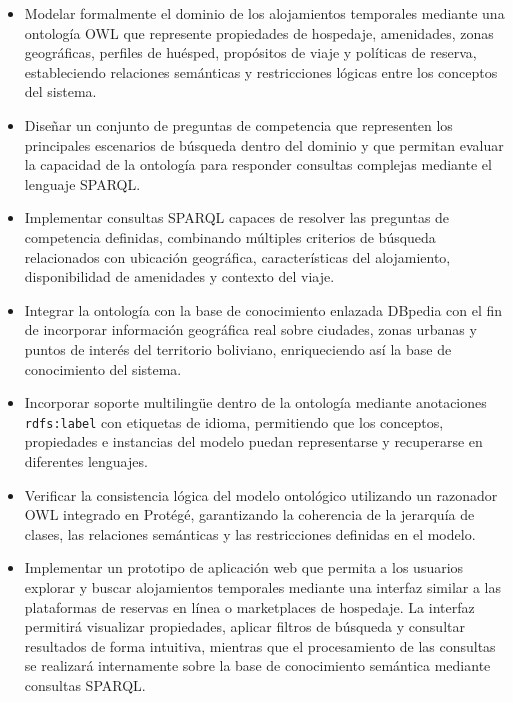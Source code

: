 \begin{itemize}

      \item Modelar formalmente el dominio de los alojamientos temporales mediante una
      ontología OWL que represente propiedades de hospedaje, amenidades, zonas
      geográficas, perfiles de huésped, propósitos de viaje y políticas de reserva,
      estableciendo relaciones semánticas y restricciones lógicas entre los
      conceptos del sistema.

      \item Diseñar un conjunto de preguntas de competencia que representen los
      principales escenarios de búsqueda dentro del dominio y que permitan evaluar
      la capacidad de la ontología para responder consultas complejas mediante el
      lenguaje SPARQL.

      \item Implementar consultas SPARQL capaces de resolver las preguntas de
      competencia definidas, combinando múltiples criterios de búsqueda relacionados
      con ubicación geográfica, características del alojamiento, disponibilidad de
      amenidades y contexto del viaje.

      \item Integrar la ontología con la base de conocimiento enlazada DBpedia con el
      fin de incorporar información geográfica real sobre ciudades, zonas urbanas y
      puntos de interés del territorio boliviano, enriqueciendo así la base de
      conocimiento del sistema.

      \item Incorporar soporte multilingüe dentro de la ontología mediante
      anotaciones \texttt{rdfs:label} con etiquetas de idioma, permitiendo que los
      conceptos, propiedades e instancias del modelo puedan representarse y
      recuperarse en diferentes lenguajes.

      \item Verificar la consistencia lógica del modelo ontológico utilizando un
      razonador OWL integrado en Protégé, garantizando la coherencia de la jerarquía
      de clases, las relaciones semánticas y las restricciones definidas en el
      modelo.

      \item Implementar un prototipo de aplicación web que permita a los usuarios
      explorar y buscar alojamientos temporales mediante una interfaz similar a las
      plataformas de reservas en línea o marketplaces de hospedaje. La interfaz
      permitirá visualizar propiedades, aplicar filtros de búsqueda y consultar
      resultados de forma intuitiva, mientras que el procesamiento de las consultas
      se realizará internamente sobre la base de conocimiento semántica mediante
      consultas SPARQL.

\end{itemize}